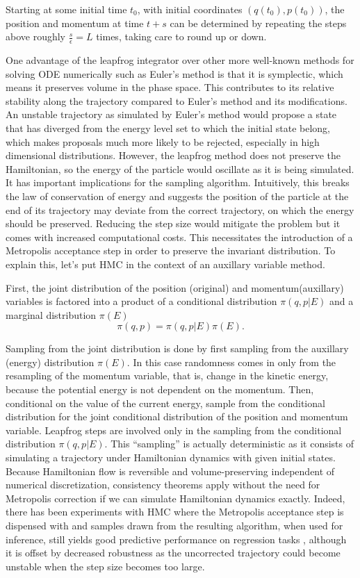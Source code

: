 \documentclass[12pt]{report}
\begin{document}
Starting at some initial time $t_0$, with initial coordinates $(q(t_0),p(t_0))$, the position and momentum at time $t+s$ can be determined by repeating the steps above roughly $\frac{s}{\epsilon} = L$ times, taking care to round up or down. 

One advantage of the leapfrog integrator over other more well-known methods for
solving ODE numerically such as Euler's method is that it is symplectic, which
means it preserves volume in the phase space. This
contributes to its relative stability along the trajectory compared to Euler's
method and its modifications. An unstable trajectory as simulated by Euler's
method would propose a state that has diverged from the energy level set to
which the initial state belong, which makes proposals much more likely to be
rejected, especially in high dimensional distributions.  However,
the leapfrog method does not preserve the Hamiltonian, so the energy of the particle would
oscillate as it is being simulated. It has important implications for the
sampling algorithm. Intuitively, this breaks the law of conservation of energy
and suggests the position of the particle at the end of its trajectory may
deviate from the correct trajectory, on which the energy should be preserved.
Reducing the step size would mitigate the problem but it comes with increased
computational costs. This necessitates the introduction of a Metropolis
acceptance step in order to preserve the invariant distribution. To explain
this, let's put HMC in the context of an auxillary variable method. 

First, the joint distribution of the position (original) and momentum(auxillary)
variables is factored into a product of a conditional distribution $\pi(q,p|E)$ and a
marginal distribution $\pi(E)$
\[ \pi(q,p) = \pi(q,p|E)\pi(E) .\]

Sampling from the joint distribution is done by first sampling from the
auxillary (energy) distribution $\pi(E)$. In this case randomness comes in only from the
resampling of the momentum variable, that is, change in the kinetic energy,
because the potential energy is not dependent on the momentum. Then, conditional on the value of the
current energy, sample from the conditional distribution for the joint
conditional distribution of the position and momentum variable. Leapfrog steps
are involved only in the sampling from the conditional distribution $\pi(q,p|E)$.
This ``sampling'' is actually deterministic as it consists of simulating a
trajectory under Hamiltonian dynamics with given initial states. Because
Hamiltonian flow is reversible and volume-preserving independent of numerical
discretization, consistency theorems apply without the need for Metropolis
correction if we can simulate Hamiltonian dynamics exactly. Indeed, there has
been experiments with HMC where the Metropolis acceptance step is dispensed with
and samples drawn from the resulting algorithm, when used for inference, still yields good predictive
performance on regression tasks \cite{neal1993bayesian}, although it is offset
by
decreased robustness as the uncorrected trajectory could become unstable when
the step size becomes too large.
\end{document}
